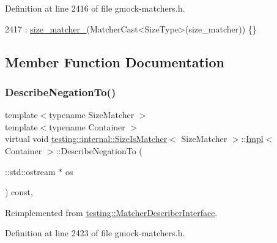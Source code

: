 Definition at line 2416 of file gmock-\/matchers.\+h.


\begin{DoxyCode}
2417         : \hyperlink{classtesting_1_1internal_1_1SizeIsMatcher_1_1Impl_a47227c64c6261eb2bc5a69e2ed9ac921}{size\_matcher\_}(MatcherCast<SizeType>(size\_matcher)) \{\}
\end{DoxyCode}


\subsection{Member Function Documentation}
\mbox{\label{classtesting_1_1internal_1_1SizeIsMatcher_1_1Impl_a24b76fc2ac7b8d58cb5c7a3c5d5d35ab}} 
\subsubsection{\texorpdfstring{Describe\+Negation\+To()}{DescribeNegationTo()}}
{\footnotesize\ttfamily template$<$typename Size\+Matcher $>$ \\
template$<$typename Container $>$ \\
virtual void \hyperlink{classtesting_1_1internal_1_1SizeIsMatcher}{testing\+::internal\+::\+Size\+Is\+Matcher}$<$ Size\+Matcher $>$\+::\hyperlink{classtesting_1_1internal_1_1SizeIsMatcher_1_1Impl}{Impl}$<$ Container $>$\+::Describe\+Negation\+To (\begin{DoxyParamCaption}\item[{\+::std\+::ostream $\ast$}]{os }\end{DoxyParamCaption}) const\hspace{0.3cm}{\ttfamily [inline]}, {\ttfamily [virtual]}}



Reimplemented from \hyperlink{classtesting_1_1MatcherDescriberInterface_a2071afbc47097c4d1c0064275af34db0}{testing\+::\+Matcher\+Describer\+Interface}.



Definition at line 2423 of file gmock-\/matchers.\+h.


